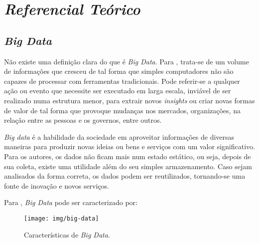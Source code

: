 
\chapter{\emph{Referencial Teórico}}

\section{\emph{Big Data}}

Não existe uma definição clara do que é \emph{Big Data}. Para , trata-se de um volume de informações que cresceu de tal forma que simples computadores não são capazes de processar com ferramentas tradicionais. Pode referir-se a qualquer ação ou evento que necessite ser executado em larga escala, inviável de ser realizado numa estrutura menor, para extrair novos \emph{insights} ou criar novas formas de valor de tal forma que provoque mudanças nos mercados, organizações, na relação entre as pessoas e os governos, entre outros.


\emph{Big data} é a habilidade da sociedade em aproveitar informações de diversas maneiras para produzir novas ideias ou bens e serviços com um valor significativo\cite[p. 2]{CUKIER}. Para os autores, os dados não ficam mais num estado estático, ou seja, depois de sua coleta, existe uma utilidade além do seu simples armazenamento. Caso sejam analisados da forma correta, os dados podem ser reutilizados, tornando-se uma fonte de inovação e novos serviços.

Para \cite[p. 5]{ZIKO}, \emph{Big Data} pode ser caracterizado por:

\begin{figure}[!ht]
\caption{Características de \emph{Big Data}. }
\centerline{\texttt{[image: img/big-data]}}
\end{figure}

